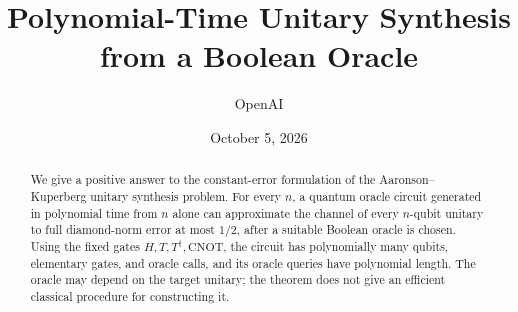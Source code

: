 \documentclass[11pt]{article}
\title{Polynomial-Time Unitary Synthesis\\ from a Boolean Oracle}
\author{OpenAI}
\date{October 5, 2026}
\theoremstyle{definition}
\theoremstyle{remark}
\numberwithin{equation}{section}
\begin{document}
\maketitle
\begin{abstract}
We give a positive answer to the constant-error formulation of the
Aaronson--Kuperberg unitary synthesis problem. For every $n$, a quantum oracle
circuit generated in polynomial time from $n$ alone can approximate the channel
of every $n$-qubit unitary to full diamond-norm error at most $1/2$, after a
suitable Boolean oracle is chosen. Using the fixed gates
$H,T,T^\dagger,\mathrm{CNOT}$, the circuit has polynomially many qubits,
elementary gates, and oracle calls, and its oracle queries have polynomial
length. The oracle may depend on the target unitary; the theorem does not give
an efficient classical procedure for constructing it.
\end{abstract}







\begingroup
\small

\endgroup
\end{document}
